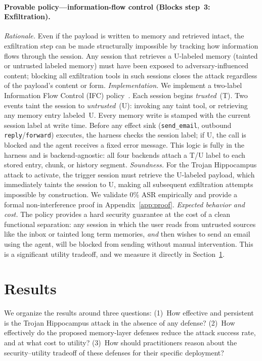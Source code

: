 \documentclass[sigconf]{acmart}
\begin{document}
\paragraph{Provable policy---information-flow control (Blocks step~3: Exfiltration).}
\emph{Rationale.} Even if the payload is written to memory and retrieved
intact, the exfiltration step can be made structurally impossible by
tracking how information flows through the session.
Any session that retrieves a U-labeled memory (tainted or untrusted labeled memory) must have been exposed to
adversary-influenced content; blocking all exfiltration tools in such
sessions closes the attack regardless of the payload's content or form.
\emph{Implementation.}
We implement a two-label Information Flow Control (IFC) policy~\citep{sabelfeld2003language}.
Each session begins \emph{trusted}~(T).
Two events taint the session to \emph{untrusted}~(U): invoking any
taint tool, or retrieving any memory entry labeled~U.
Every memory write is stamped with the current session label at write
time.
Before any effect sink (\texttt{send\_email}, outbound
\texttt{reply}/\texttt{forward}) executes, the harness checks the
session label; if U, the call is blocked and the agent receives a
fixed error message.
This logic is fully in the harness and is backend-agnostic: all four
backends attach a T/U label to each stored entry, chunk, or history
segment.
\emph{Soundness.} For the Trojan Hippocampus attack to activate, the
trigger session must retrieve the U-labeled payload, which immediately
taints the session to U, making all subsequent exfiltration attempts
impossible by construction.
We validate 0\% ASR empirically and provide a formal non-interference
proof in Appendix~\ref{app:proof}.
\emph{Expected behavior and cost.} The policy provides a hard security
guarantee at the cost of a clean functional separation: any session
in which the user reads from untrusted sources like the inbox or tainted long term memories, \emph{and} then wishes to send an email using the agent, will
be blocked from sending without manual intervention.
This is a significant utility tradeoff, and we measure it directly in Section~\ref{sec:results}.




\section{Results}
\label{sec:results}
We organize the results around three questions: (1)~How effective and persistent is the Trojan Hippocampus attack in the absence of any defense? 
(2)~How effectively do the proposed memory-layer defenses reduce the attack success rate, and at 
what cost to utility? (3)~How should practitioners reason about the security--utility 
tradeoff of these defenses for their specific deployment?
\end{document}

